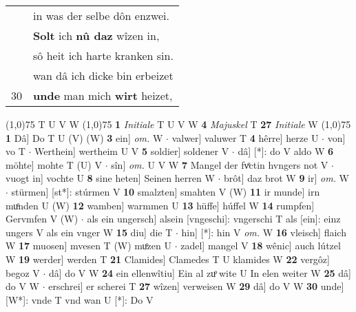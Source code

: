 \documentclass[8pt,a4paper,notitlepage]{article}
\begin{document}
\begin{table}[ht]
\begin{minipage}[t]{0.5\linewidth}
\begin{tabular}{rl}
 & in was der selbe dôn enzwei.\\ 
 & \textbf{Solt} ich \textbf{nû daz} wîzen in,\\ 
 & sô heit ich harte kranken sin.\\ 
 & wan dâ ich dicke bin erbeizet\\ 
30 & \textbf{unde} man mich \textbf{wirt} heizet,\\ 
\end{tabular}
\scriptsize
\line(1,0){75} \newline
T U V W \newline
\line(1,0){75} \newline
\textbf{1} \textit{Initiale} T U V W  \textbf{4} \textit{Majuskel} T  \textbf{27} \textit{Initiale} W  \newline
\line(1,0){75} \newline
\textbf{1} Dâ] Do T U (V) (W) \textbf{3} ein] \textit{om.} W  $\cdot$ valwer] valuwer T \textbf{4} hêrre] herze U  $\cdot$ von] vo T  $\cdot$ Werthein] wertheim U V \textbf{5} soldier] soldener V  $\cdot$ dâ] [*]: do V aldo W \textbf{6} möhte] mohte T (U) V  $\cdot$ sîn] \textit{om.} U V W \textbf{7} Mangel der fvͦctin hvngers not V  $\cdot$ vuogt in] vochte U \textbf{8} sine heten] Seinen herren W  $\cdot$ brôt] daz brot W \textbf{9} ir] \textit{om.} W  $\cdot$ stürmen] [st*]: stúrmen V \textbf{10} smalzten] smahten V (W) \textbf{11} ir munde] irn muͦnden U (W) \textbf{12} wamben] warmmen U \textbf{13} hüffe] húffel W \textbf{14} rumpfen] Gervmfen V (W)  $\cdot$ als ein ungersch] alsein [vngeschi]: vngerschi T als [ein]: einz ungers V als ein vnger W \textbf{15} diu] die T  $\cdot$ hin] [*]: hin V \textit{om.} W \textbf{16} vleisch] flaich W \textbf{17} muosen] mvesen T (W) muͦzen U  $\cdot$ zadel] mangel V \textbf{18} wênic] auch lútzel W \textbf{19} werder] werden T \textbf{21} Clamides] Clamedes T U klamides W \textbf{22} vergôz] begoz V  $\cdot$ dâ] do V W \textbf{24} ein ellenwîtiu] Ein al zuͦ wite U In elen weiter W \textbf{25} dâ] do V W  $\cdot$ erschrei] er scherei T \textbf{27} wîzen] verweisen W \textbf{29} dâ] do V W \textbf{30} unde] [W*]: vnde T vnd wan U [*]: Do V \newline
\end{minipage}
\end{table}
\end{document}
